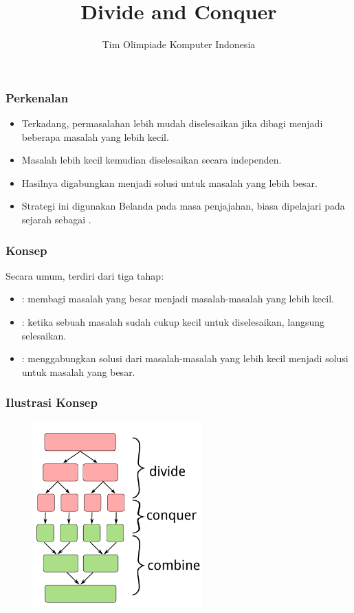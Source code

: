 

\title{Divide and Conquer}
\author{Tim Olimpiade Komputer Indonesia}
\date{}



\begin{frame}
\titlepage
\end{frame}

\begin{frame}
\frametitle{Perkenalan}
\begin{itemize}
  \item Terkadang, permasalahan lebih mudah diselesaikan jika dibagi menjadi beberapa masalah yang lebih kecil.
  \item Masalah lebih kecil kemudian diselesaikan secara independen.
  \item Hasilnya digabungkan menjadi solusi untuk masalah yang lebih besar.
  \item Strategi ini digunakan Belanda pada masa penjajahan, biasa dipelajari pada sejarah sebagai .
\end{itemize}
\end{frame}

\begin{frame}
\frametitle{Konsep}
Secara umum, \newTerm{\fdivideAndConquer} terdiri dari tiga tahap:
\begin{itemize}
  \item {}: membagi masalah yang besar menjadi masalah-masalah yang lebih kecil.
  \item {}: ketika sebuah masalah sudah cukup kecil untuk diselesaikan, langsung selesaikan.
  \item {}: menggabungkan solusi dari masalah-masalah yang lebih kecil menjadi solusi untuk masalah yang besar.
\end{itemize}
\end{frame}

\begin{frame}
\frametitle{Ilustrasi Konsep}
\begin{figure}
  \includegraphics[width=6.5cm]{asset/dnc-concept.pdf}
\end{figure}
\end{frame}


